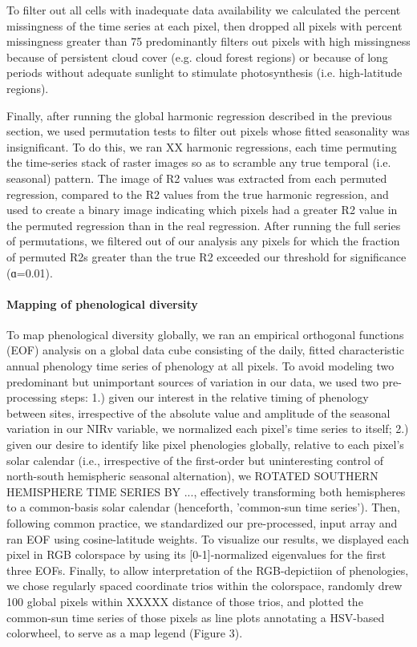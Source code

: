 \documentclass[12pt]{article}
\begin{document}
To filter out all cells with inadequate data availability we calculated
the percent missingness of the time series at each pixel, then dropped
all pixels with percent missingness greater than 75%
predominantly filters out pixels with high missingness because of
persistent cloud cover (e.g. cloud forest regions) or because of long
periods without adequate sunlight to stimulate photosynthesis (i.e.
high-latitude regions).

Finally, after running the global harmonic regression described in the
previous section, we used permutation tests to filter out pixels whose
fitted seasonality was insignificant. To do this, we ran XX harmonic
regressions, each time permuting the time-series stack of raster images
so as to scramble any true temporal (i.e. seasonal) pattern. The image of
R2 values was extracted from each permuted regression, compared to the R2
values from the true harmonic regression, and used to create a binary
image indicating which pixels had a greater R2 value in the permuted
regression than in the real regression. After running the full series of
permutations, we filtered out of our analysis any pixels for which the
fraction of permuted R2s greater than the true R2 exceeded our threshold
for significance (ɑ=0.01).

\paragraph*{Mapping of phenological diversity}
To map phenological diversity globally, we ran an empirical orthogonal functions (EOF)
analysis on a global data cube consisting of the daily, fitted characteristic
annual phenology time series of phenology at all pixels.
To avoid modeling two predominant but unimportant sources of variation in our data,
we used two pre-processing steps: 1.) given our interest in the relative
timing of phenology between sites, irrespective of the absolute value and amplitude of
the seasonal variation in our NIRv variable, we normalized each pixel's time series to
itself; 2.) given our desire to identify like pixel phenologies globally,
relative to each pixel's solar calendar (i.e., irrespective of the first-order
but uninteresting control of north-south hemispheric seasonal alternation),
we ROTATED SOUTHERN HEMISPHERE TIME SERIES BY ..., effectively transforming both
hemispheres to a common-basis solar calendar (henceforth, 'common-sun time series').
Then, following common practice, we standardized our pre-processed, input
array and ran EOF using cosine-latitude weights.
To visualize our results, we displayed each pixel in RGB colorspace by using
its [0-1]-normalized eigenvalues for the first three EOFs.
Finally, to allow interpretation of the RGB-depictiion of phenologies,
we chose regularly spaced coordinate trios within the colorspace,
randomly drew 100 global pixels within XXXXX distance of those trios,
and plotted the common-sun time series of those pixels as line plots annotating
a HSV-based colorwheel, to serve as a map legend (Figure 3).
\end{document}
